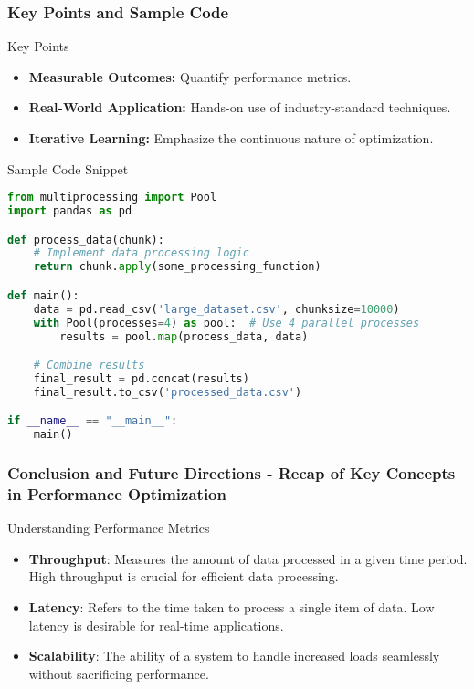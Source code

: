 \documentclass[aspectratio=169]{beamer}
\begin{document}
\begin{frame}[fragile]
    \frametitle{Key Points and Sample Code}
    \begin{block}{Key Points}
        \begin{itemize}
            \item \textbf{Measurable Outcomes:} Quantify performance metrics.
            \item \textbf{Real-World Application:} Hands-on use of industry-standard techniques.
            \item \textbf{Iterative Learning:} Emphasize the continuous nature of optimization.
        \end{itemize}
    \end{block}

    \begin{block}{Sample Code Snippet}
        \begin{lstlisting}[language=Python]
from multiprocessing import Pool
import pandas as pd

def process_data(chunk):
    # Implement data processing logic
    return chunk.apply(some_processing_function)

def main():
    data = pd.read_csv('large_dataset.csv', chunksize=10000)
    with Pool(processes=4) as pool:  # Use 4 parallel processes
        results = pool.map(process_data, data)

    # Combine results
    final_result = pd.concat(results)
    final_result.to_csv('processed_data.csv')

if __name__ == "__main__":
    main()
        \end{lstlisting}
    \end{block}
\end{frame}

\begin{frame}[fragile]
    \frametitle{Conclusion and Future Directions - Recap of Key Concepts in Performance Optimization}
    \begin{block}{Understanding Performance Metrics}
        \begin{itemize}
            \item \textbf{Throughput}: Measures the amount of data processed in a given time period. High throughput is crucial for efficient data processing.
            \item \textbf{Latency}: Refers to the time taken to process a single item of data. Low latency is desirable for real-time applications.
            \item \textbf{Scalability}: The ability of a system to handle increased loads seamlessly without sacrificing performance.
        \end{itemize}
    \end{block}
\end{frame}
\end{document}
